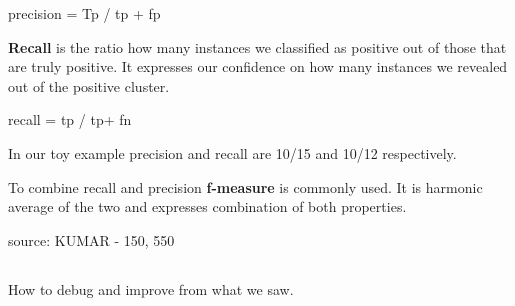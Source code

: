 precision = Tp / tp + fp

{\bf Recall} is the ratio how many instances we classified as positive out of those that are truly positive.
It expresses our confidence on how many instances we revealed out of the positive cluster.

recall = tp / tp+ fn

In our toy example precision and recall are 10/15 and 10/12 respectively.

To combine recall and precision {\bf f-measure} is commonly used.
It is harmonic average of the two and expresses combination of both properties.



{source: KUMAR - 150, 550}




\subsection{}

\subsection{}

How to debug and improve from what we saw.

\subsection{}
